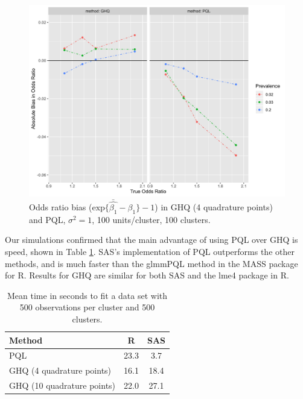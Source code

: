 \documentclass[Afour,times,sagev,doublespace]{sagej}
\begin{document}
\begin{figure}
\centering
\includegraphics[width=\linewidth]{_bias_pql_ghq4.png}
  \caption{Odds ratio bias ($\text{exp} \{ \bar{\hat{\beta_1}} - \beta_1 \} - 1$) in GHQ (4 quadrature points) and PQL, $\sigma^2=1$, 100 units/cluster, 100 clusters.}
  \label{fig:_bias_pql_ghq4}
\end{figure}

Our simulations confirmed that the main advantage of using PQL over GHQ is speed, shown in Table \ref{tab:method_speed}. SAS's implementation of PQL outperforms the other methods, and is much faster than the glmmPQL method in the MASS package for R. Results for GHQ are similar for both SAS and the lme4 package in R.


\begin{table}[h]
\centering
 \begin{tabular}{l | c c} 
 Method & R & SAS \\ 
 \hline
 PQL & 23.3 & 3.7 \\ 
 GHQ (4 quadrature points) & 16.1 &  18.4 \\
 GHQ (10 quadrature points) & 22.0 &  27.1 \\ 
 \end{tabular}
    \caption{Mean time in seconds to fit a data set with 500 observations per cluster and 500 clusters.}
    \label{tab:method_speed}
\end{table}
\end{document}
